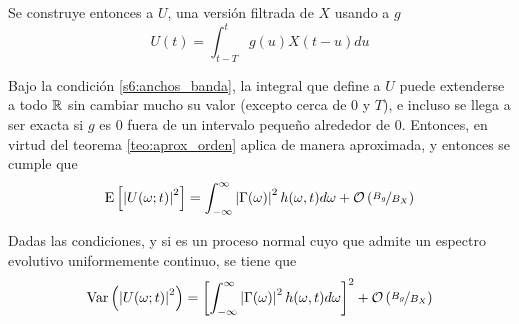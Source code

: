 Se construye entonces a $U$, una versión filtrada de $X$ usando a $g$
\begin{equation}
U(t) = \int_{t-T}^{t} g(u) X(t-u) du
\end{equation}

Bajo la condición \ref{s6:anchos_banda}, la integral que define a $U$ puede extenderse a todo $\mathbb{R}$ sin cambiar mucho su valor (excepto cerca de 0 y $T$), e incluso se llega a ser exacta si $g$ es 0 fuera de un intervalo pequeño alrededor de 0. Entonces, en virtud del teorema \ref{teo:aprox_orden}
aplica de manera aproximada, y entonces se cumple que
\begin{equation}
\mathrm{E}\left[ \left| U(\omega; t) \right|^{2} \right] = \int_{-\infty}^{\infty} \left| \Gamma(\omega) \right|^{2} h(\omega, t)d\omega + \mathcal{O}\left( \nicefrac{B_g}{B_X} \right)
\end{equation}


\begin{proposicion}
Dadas las condiciones, y si \xt es un proceso normal cuyo que admite un espectro evolutivo uniformemente continuo, se tiene que
\begin{equation}
\mathrm{Var}\left( \left| U(\omega;t) \right|^{2} \right) = \left[ \int_{-\infty}^{\infty} \left| \Gamma(\omega) \right|^{2} h(\omega, t)d\omega \right]^{2} + \mathcal{O}\left( \nicefrac{B_g}{B_X} \right)
\end{equation}
\end{proposicion}


